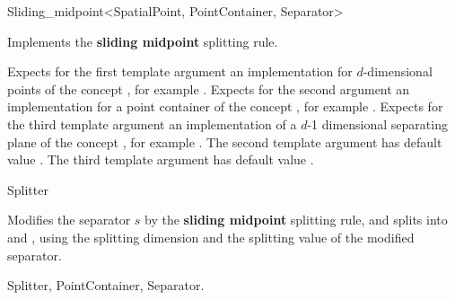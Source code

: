 

\begin{ccRefFunctionObjectClass}{Sliding_midpoint<SpatialPoint, PointContainer, Separator>}  %


\ccDefinition
Implements the {\bf sliding midpoint} splitting rule.


\ccParameters

Expects for the first template argument an implementation for
$d$-dimensional points of
the concept , 
for example . Expects for the second argument an implementation
for a point container of the concept , for example .
Expects for the third template argument an implementation of a $d$-1 dimensional 
separating plane of the concept , for example .
The second template argument has default value .
The third template argument has default value . 


\ccIsModel

Splitter

\ccTypes



\ccOperations

{Modifies the separator $s$ by the {\bf sliding midpoint} splitting rule, 
and splits  into  and ,
using the splitting dimension and the splitting value of the modified separator.
}

\ccSeeAlso

Splitter, PointContainer, Separator.
\end{ccRefFunctionObjectClass}


